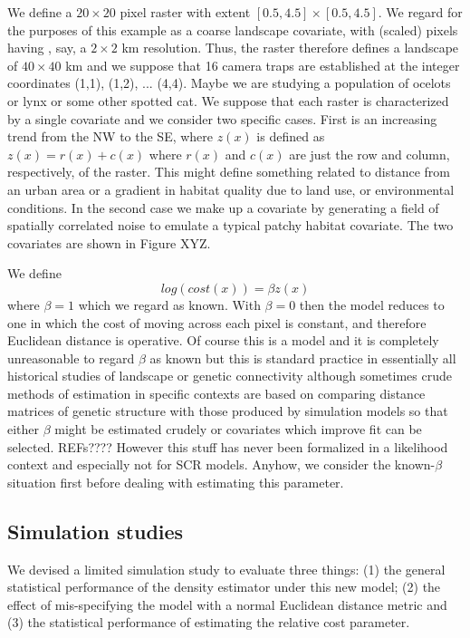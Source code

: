 We define a $20 \times 20$ pixel raster with
extent $[0.5, 4.5] \times [0.5, 4.5]$.
We regard for the purposes of this example as a coarse landscape 
covariate, with (scaled) pixels having ,  say, a $2 \times 2$ km resolution. Thus, the raster
therefore
defines a landscape of $40 \times 40$ km and we suppose that 16 camera
traps are established at the integer coordinates (1,1), (1,2),
... (4,4). 
Maybe we are studying a population of ocelots or lynx or some other
spotted cat.
We suppose 
that each raster is characterized by a single covariate and we consider two specific
cases. First is an increasing trend from 
the NW to the SE, where $z(x)$ is defined as $z(x) = r(x) + c(x)$ where $r(x)$ and $c(x)$ are 
just the row and column, respectively, of the raster. 
This might define something related to distance
from an urban area or a gradient in habitat quality due to land use,
or environmental conditions. 
In the second case we make up a covariate by generating a field of spatially correlated
noise to emulate a typical patchy habitat covariate. The two covariates are shown in 
Figure XYZ. 

We define 
\[
 log(cost(x))=  \beta z(x) 
 \]
where $\beta = 1$ which we regard as known. With $\beta=0$ then the model reduces to
one in which the cost of moving across each pixel is constant, and therefore Euclidean
distance is operative.
 Of course this is a model and it is completely
unreasonable to regard $\beta$ as known but this is standard practice in essentially all
historical studies of landscape or genetic connectivity although sometimes crude methods
of estimation in specific contexts are based on comparing distance matrices of genetic
structure with those produced by simulation models so that either $\beta$ might be estimated
crudely or covariates which improve fit can be selected. REFs????
However this stuff has never been formalized in a likelihood context and especially
not for SCR models. 
Anyhow, we consider the known-$\beta$ situation first before dealing with estimating
this parameter. 


\subsection{Simulation studies}

We devised a limited simulation study to evaluate three things: (1)
the general statistical performance of the density estimator under
this new model; (2) the effect of mis-specifying the model with a
normal Euclidean distance metric and (3) the statistical performance
of estimating the relative cost parameter.

